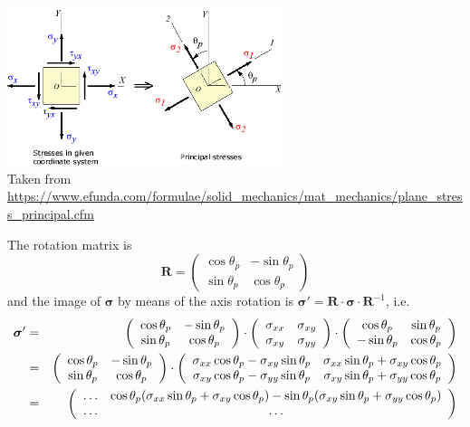\begin{center}
\includegraphics[width=8cm]{images/princ_stress/PrincipalStress}\\
{\scriptsize Taken from \url{https://www.efunda.com/formulae/solid_mechanics/mat_mechanics/plane_stress_principal.cfm}}
\end{center}
The rotation matrix is 
\[
{\bm R}=
\left(
\begin{array}{cc}
\cos\theta_p & -\sin\theta_p \\
\sin\theta_p & \cos\theta_p
\end{array}
\right)
\]
and the image of ${\bm \sigma}$ by means of the axis rotation is 
${\bm \sigma}'= {\bm R}\cdot {\bm \sigma}\cdot {\bm R}^{-1}$, i.e.
\begin{eqnarray}
{\bm \sigma}' 
&=&
\left(
\begin{array}{cc}
\cos\theta_p & -\sin\theta_p \\
\sin\theta_p & \cos\theta_p
\end{array}
\right)
\cdot
\left(
\begin{array}{cc}
\sigma_{xx} & \sigma_{xy} \\
\sigma_{xy} & \sigma_{yy} 
\end{array}
\right)
\cdot
\left(
\begin{array}{cc}
\cos\theta_p & \sin\theta_p \\
-\sin\theta_p & \cos\theta_p
\end{array}
\right) \nonumber\\
&=&\left(
\begin{array}{cc}
\cos\theta_p & -\sin\theta_p \\
\sin\theta_p & \cos\theta_p
\end{array}
\right)
\cdot
\left(
\begin{array}{cc}
\sigma_{xx} \cos\theta_p - \sigma_{xy} \sin\theta_p  &
\sigma_{xx} \sin\theta_p + \sigma_{xy} \cos\theta_p  \\
\sigma_{xy} \cos\theta_p - \sigma_{yy} \sin\theta_p & 
\sigma_{xy} \sin\theta_p + \sigma_{yy} \cos\theta_p 
\end{array}
\right) \nonumber\\
&=&
\left(
\begin{array}{cc}
\dots & 
\cos\theta_p(\sigma_{xx} \sin\theta_p + \sigma_{xy} \cos\theta_p )-
\sin\theta_p(\sigma_{xy} \sin\theta_p + \sigma_{yy} \cos\theta_p ) \\
\dots & \dots 
\end{array}
\right) \nonumber 
\end{eqnarray}
